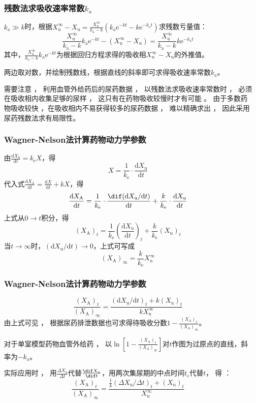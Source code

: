 \documentclass[dvipsnames, svgnames, x11names]{beamer}
\begin{document}
\begin{frame}
    \frametitle{残数法求吸收速率常数$k_\mathrm{a}$}
    $k_\mathrm{a}\gg k$时，根据$X_\mathrm{u}^\infty - X_\mathrm{u} = \frac{X_\mathrm{u}^\infty}{k_\mathrm{a} - k}(k_\mathrm{a}\mathrm{e}^{-kt} - k\mathrm{e}^{-k_\mathrm{a}t})$求残数亏量值：
    \[
        \frac{X_\mathrm{u}^\infty}{k_\mathrm{a} - k} k_\mathrm{a}\mathrm{e}^{-kt} - (X_\mathrm{u}^\infty - X_\mathrm{u}) = \frac{X_\mathrm{u}^\infty}{k_\mathrm{a} - k} k\mathrm{e}^{-k_\mathrm{a}t}
    \]
    其中，$\frac{X_\mathrm{u}^\infty}{k_\mathrm{a} - k} k_\mathrm{a}\mathrm{e}^{-kt}$为根据回归方程求得的吸收相$X_\mathrm{u}^\infty - X_\mathrm{u}$的外推值。

    两边取对数，并绘制残数线，根据直线的斜率即可求得吸收速率常数$k_\mathrm{a}$。
    \begin{blankblock}{}
        需要注意 ， 利用血管外给药后的尿药数据 ， 以残数法求吸收速率常数时 ， 必须在吸收相内收集足够的尿样 ， 这只有在药物吸收较慢时才有可能 。 由于多数药物吸收较快 ，在吸收相内不易获得较多的尿药数据 ， 难以精确求出 ， 因此采用尿药残数法求有局限性。
    \end{blankblock}
\end{frame}


\begin{frame}
    \frametitle{Wagner-Nelson法计算药物动力学参数}
    由$\frac{\mathrm{d}X_\mathrm{u}}{\mathrm{d}t}=k_\mathrm{e}X$，得
    \[
        X = \frac{1}{k_\mathrm{e}} \cdot \frac{\mathrm{d}X_\mathrm{u}}{\mathrm{d}t}
    \]
    代入式$\frac{\mathrm{d}X_\mathrm{A}}{\mathrm{d}t} = \frac{\mathrm{d}X}{\mathrm{d}t} + kX$，得
    \[
        \frac{\mathrm{d}X_\mathrm{A}}{\mathrm{d}t} = \frac{1}{k_\mathrm{e}} \cdot \frac{\dif (\mathrm{d}X_\mathrm{u}/\mathrm{d}t)}{\mathrm{d}t} + \frac{k}{k_\mathrm{e}} \cdot \frac{\mathrm{d}X_\mathrm{u}}{\mathrm{d}t}
    \]
    上式从$0 \to t$积分，得
    \[
        (X_\mathrm{A})_t = \frac{1}{k_\mathrm{e}} \left(\frac{\mathrm{d}X_\mathrm{u}}{\mathrm{d}t}\right)_t + \frac{k}{k_\mathrm{e}}(X_\mathrm{u})_t
    \]
    当$t \to \infty$时，$(\mathrm{d}X_\mathrm{u}/\mathrm{d}t) \to 0$，上式可写成
    \[
        (X_\mathrm{A})_\infty = \frac{k}{k_\mathrm{e}}X_\mathrm{u}^\infty
    \]
\end{frame}


\begin{frame}
    \frametitle{Wagner-Nelson法计算药物动力学参数}
    \[
        \frac{(X_\mathrm{A})_t}{(X_\mathrm{A})_\infty} = \frac{(\mathrm{d}X_\mathrm{u}/\mathrm{d}t)_t + k(X_\mathrm{u})_t}{kX_\mathrm{u}^\infty}
    \]
    由上式可见 ， 根据尿药排泄数据也可求得待吸收分数$1-\frac{(X_\mathrm{A})_t}{(X_\mathrm{A})_\infty}$。
    
    对于单室模型药物血管外给药 ， 以$\ln \left[1-\frac{(X_\mathrm{A})_t}{(X_\mathrm{A})_\infty}\right]$对$t$作图为过原点的直线，斜率为$-k_\mathrm{a}$。

    实际应用时 ， 用$\frac{\Delta X_\mathrm{u}}{\Delta t}$代替$\frac{\dif X_\mathrm{u}}{\dif t}$，用两次集尿期的中点时间$t_\mathrm{c}$代替$t$， 得 ：
    \[
        \frac{(X_\mathrm{A})_t}{(X_\mathrm{A})_\infty} = \frac{\frac{1}{k}(\Delta X_\mathrm{u}/\Delta t)_t + (X_\mathrm{u})_t}{X_\mathrm{u}^\infty}
    \]
\end{frame}
\end{document}
